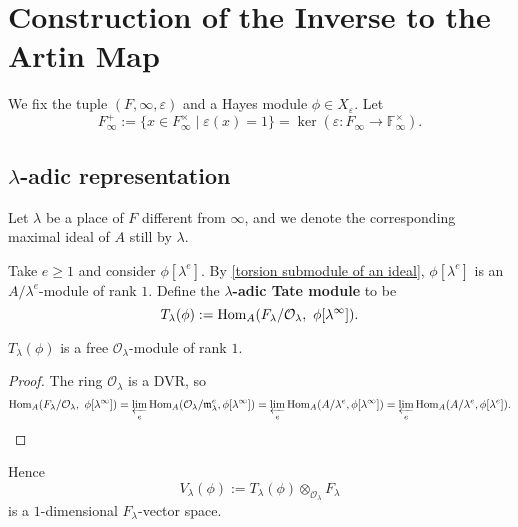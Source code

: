\documentclass{article}
\newcommand{\F}{\mathbb{F}}
\renewcommand{\O}{\mathcal{O}}
\newcommand{\m}{\mathfrak{m}}
\begin{document}
\section{Construction of the Inverse to the Artin Map}
We fix the tuple $(F, \infty, \varepsilon)$
and a Hayes module $\phi\in X_\varepsilon$.
Let \[F_\infty^+ := \{x\in F_\infty^\times\mid \varepsilon(x) = 1\} = \ker(\varepsilon : F_\infty\to \F_\infty^\times).\]



\subsection{\texorpdfstring{$\lambda$}{lambda}-adic representation}
Let $\lambda$ be a place of $F$ different from $\infty$, and we denote the corresponding maximal ideal of $A$ still by $\lambda$.

Take $e\ge 1$ and consider $\phi[\lambda^e]$.
By \cref{torsion submodule of an ideal},
$\phi[\lambda^e]$ is an $A/\lambda^e$-module of rank $1$.
Define the \textbf{$\lambda$-adic Tate module} to be\[T_\lambda(\phi) := \Hom_A(F_\lambda/\O_\lambda,\ \phi[\lambda^\infty]).\]
\begin{proposition}
    $T_\lambda(\phi)$ is a free $\O_\lambda$-module of rank $1$.
\end{proposition}
\begin{proof}
    The ring $\O_\lambda$ is a DVR, so
    \[
        \Hom_A(F_\lambda/\O_\lambda,\ \phi[\lambda^\infty])
        = \varprojlim_e \Hom_A(\O_\lambda/\m_\lambda^e, \phi[\lambda^\infty])
        = \varprojlim_e \Hom_A(A/\lambda^e, \phi[\lambda^\infty])
        = \varprojlim_e \Hom_A(A/\lambda^e, \phi[\lambda^e]).\qedhere
    \]
\end{proof}

Hence \[V_\lambda(\phi) := T_\lambda(\phi)\otimes_{\O_\lambda} F_\lambda\] is a $1$-dimensional $F_\lambda$-vector space.

\end{document}
